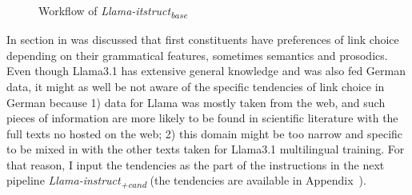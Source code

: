 \documentclass[11pt]{article}
\begin{document}
\begin{figure}[hbt!]
    \caption{Workflow of \textit{Llama-itstruct\textsubscript{base}}}
    \label{fig:llama-base}
\end{figure}


In section  in was discussed that first constituents have preferences of link choice depending on their grammatical features, sometimes semantics and prosodics. Even though Llama3.1 has extensive general knowledge and was also fed German data, it might as well be not aware of the specific tendencies of link choice in German because 1) data for Llama was mostly taken from the web, and such pieces of information are more likely to be found in scientific literature with the full texts no hosted on the web; 2) this domain might be too narrow and specific to be mixed in with the other texts taken for Llama3.1 multilingual training. For that reason, I input the tendencies as the part of the instructions in the next pipeline \textit{Llama-instruct\textsubscript{+cand}} (the tendencies are available in Appendix~).
\end{document}
